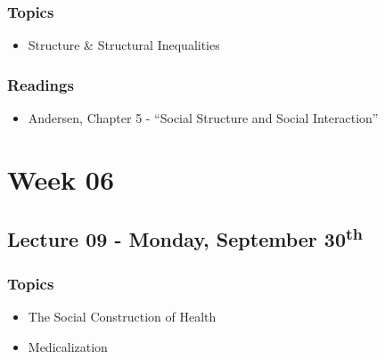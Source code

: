 \documentclass[]{book}
\providecommand{\tightlist}{%
  \setlength{\itemsep}{0pt}\setlength{\parskip}{0pt}}
\begin{document}
\hypertarget{topics-9}{%
\subsubsection*{Topics}\label{topics-9}}

\begin{itemize}
\tightlist
\item
  Structure \& Structural Inequalities
\end{itemize}

\hypertarget{readings-8}{%
\subsubsection*{Readings}\label{readings-8}}

\begin{itemize}
\tightlist
\item
  Andersen, Chapter 5 - ``Social Structure and Social Interaction''
\end{itemize}

\newpage

\hypertarget{week-06}{%
\section*{Week 06}\label{week-06}}

\hypertarget{lecture-09---monday-september-30th}{%
\subsection*{\texorpdfstring{Lecture 09 - Monday, September 30\textsuperscript{th}}{Lecture 09 - Monday, September 30th}}\label{lecture-09---monday-september-30th}}

\hypertarget{topics-10}{%
\subsubsection*{Topics}\label{topics-10}}

\begin{itemize}
\tightlist
\item
  The Social Construction of Health
\item
  Medicalization
\end{itemize}
\end{document}
